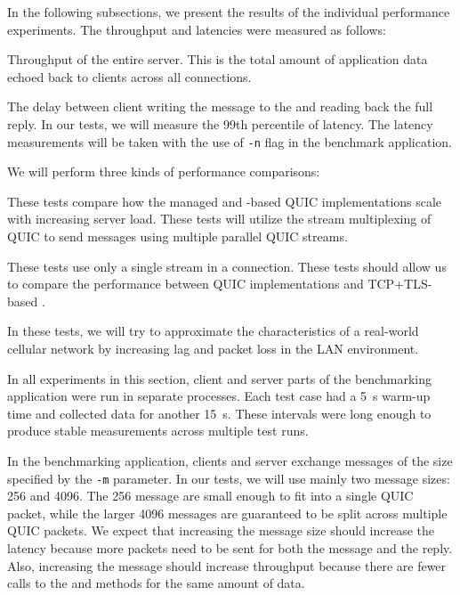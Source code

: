 In the following subsections, we present the results of the individual performance experiments. The
throughput and latencies were measured as follows:

\begin{itemize}

   Throughput of the entire server. This is the total amount of application data
echoed back to clients across all connections.

   The delay between client writing the message to the \Stream{} and reading back the
full reply. In our tests, we will measure the 99th percentile of latency. The latency measurements
will be taken with the use of \texttt{-n} flag in the benchmark application.

\end{itemize}

We will perform three kinds of performance comparisons:

\begin{itemize}

         These tests compare how the managed and
\libmsquic{}-based QUIC implementations scale with increasing server load. These tests will utilize
the stream multiplexing of QUIC to send messages using multiple parallel QUIC streams.

         These tests use only a single stream in a connection.
These tests should allow us to compare the performance between QUIC implementations and
TCP+TLS-based \SslStream{}.

         In these tests, we will try to approximate
the characteristics of a real-world cellular network by increasing lag and packet loss in the LAN
environment.

\end{itemize}

In all experiments in this section, client and server parts of the benchmarking application were run
in separate processes. Each test case had a \SI{5}{\second} warm-up time and collected data for
another \SI{15}{\second}. These intervals were long enough to produce stable measurements across
multiple test runs.

In the benchmarking application, clients and server exchange messages of the size specified by the
\texttt{-m} parameter. In our tests, we will use mainly two message sizes: \SI{256}{\byte} and
\SI{4096}{\byte}. The \SI{256}{\byte} message are small enough to fit into a single QUIC packet,
while the larger \SI{4096}{\byte} messages are guaranteed to be split across multiple QUIC packets.
We expect that increasing the message size should increase the latency because more packets need to
be sent for both the message and the reply. Also, increasing the message should increase throughput
because there are fewer calls to the  and  methods for the same
amount of data.

